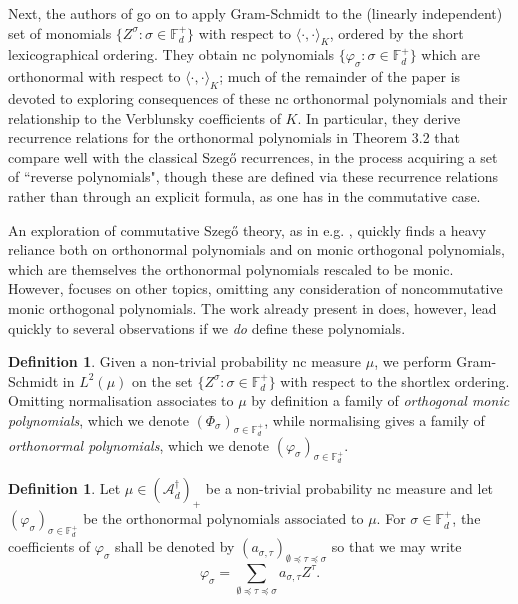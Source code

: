 \documentclass[11pt,reqno]{amsart}
\newcommand\ncm[1]{(\mathscr{A}_{#1}^{\dagger})_+}
\def\p{\varphi}
\def\s{\sigma}
\def\t{\tau}
\def\P{\Phi}
\def\FF{\mathbb{F}}
\theoremstyle{definition}
\newtheorem{definition}[theorem]{Definition}
\numberwithin{equation}{section}
\begin{document}
Next, the authors of \cite{CJ02b} go on to apply Gram-Schmidt to the (linearly independent) set of monomials \(\{Z^\s : \s \in \FF_d^+\}\) with respect to \(\langle \cdot, \cdot \rangle_K\), ordered by the short lexicographical ordering. They obtain nc polynomials \(\{\p_{\s} : \s \in \FF_d^+\}\) which are orthonormal with respect to \(\langle\cdot,\cdot\rangle_K\); much of the remainder of the paper is devoted to exploring consequences of these nc orthonormal polynomials and their relationship to the Verblunsky coefficients of \(K\). In particular, they derive recurrence relations for the orthonormal polynomials in Theorem 3.2 that compare well with the classical Szeg\H{o} recurrences, in the process acquiring a set of ``reverse polynomials", though these are defined via these recurrence relations rather than through an explicit formula, as one has in the commutative case.

An exploration of commutative Szeg\H{o} theory, as in e.g. \cite{Sim05}, quickly finds a heavy reliance both on orthonormal polynomials and on monic orthogonal polynomials, which are themselves the orthonormal polynomials rescaled to be monic. However, \cite{CJ02b} focuses on other topics, omitting any consideration of noncommutative monic orthogonal polynomials. The work already present in \cite{CJ02b} does, however, lead quickly to several observations if we \emph{do} define these polynomials.

\begin{definition}
    Given a non-trivial probability nc measure \(\mu\), we perform Gram-Schmidt in \(L^2(\mu)\) on the set \(\{Z^{\s} : \s \in \FF_d^+\}\) with respect to the shortlex ordering. Omitting normalisation associates to \(\mu\) by definition a family of \emph{orthogonal monic polynomials}, which we denote \((\P_\s)_{\s \in \FF_d^+}\), while normalising gives a family of \emph{orthonormal polynomials}, which we denote \((\p_\s)_{\s\in\FF_d^+}\).
\end{definition}

\begin{definition}
    Let \(\mu \in \ncm{d}\) be a non-trivial probability nc measure and let \((\p_\s)_{\s \in \FF_d^+}\) be the orthonormal polynomials associated to \(\mu\). For \(\s \in \FF_d^+\), the coefficients of \(\p_\s\) shall be denoted by \((a_{\s,\t})_{\emptyset \preceq \t \preceq \s}\) so that we may write
    \[
        \p_\s = \sum_{\emptyset \preceq \t \preceq \s} a_{\s,\t} Z^{\t}.
    \]
\end{definition}
\end{document}
